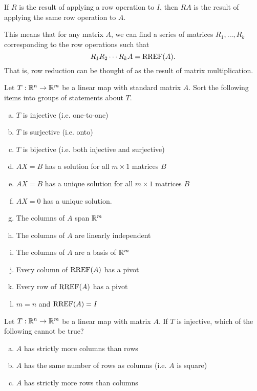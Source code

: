 \begin{applicationActivities}{2}{22}
\begin{fact}
If \(R\) is the result of applying a row operation to \(I\), then
\(RA\) is the result of applying the same row operation to \(A\).

This means that for any matrix $A$, we can find a series of matrices $R_1, \ldots, R_k$ corresponding to the row operations such that $$R_1 R_2 \cdots R_k A = \operatorname{RREF}(A).$$ That is, row reduction can be thought of as the result
of matrix multiplication.
\end{fact}


\begin{activity}{15}
Let $T: \mathbb{R}^n \rightarrow \mathbb{R}^m$ be a linear map with standard matrix $A$.
Sort the following items into groups of statements about $T$.
\begin{multicols}{2}
\begin{enumerate}[(a)]
\item $T$ is injective (i.e. one-to-one)
\item $T$ is surjective (i.e. onto)
\item $T$ is bijective (i.e. both injective and surjective)
\item $AX=B$ has a solution for all $m \times 1$ matrices $B$
\item $AX=B$ has a unique solution for all $m \times 1$ matrices $B$
\item $AX=0$ has a unique solution.
\item The columns of $A$ span $\mathbb{R}^m$
\item The columns of $A$ are linearly independent
\item The columns of $A$ are a basis of $\mathbb{R}^m$
\item Every column of $\operatorname{RREF}(A)$ has a pivot
\item Every row of $\operatorname{RREF}(A)$ has a pivot
\item $m=n$ and $\operatorname{RREF}(A)=I$
\end{enumerate}
\end{multicols}
\end{activity}

\begin{activity}{5}
Let $T: \mathbb{R}^n \rightarrow \mathbb{R}^m$ be a linear map with matrix $A$.
If $T$ is injective, which of the following cannot be true?
\begin{enumerate}[(a)]
\item $A$ has strictly more columns than rows
\item $A$ has the same number of rows as columns (i.e. $A$ is square)
\item $A$ has strictly more rows than columns
\end{enumerate}
\end{activity}


\end{applicationActivities}
